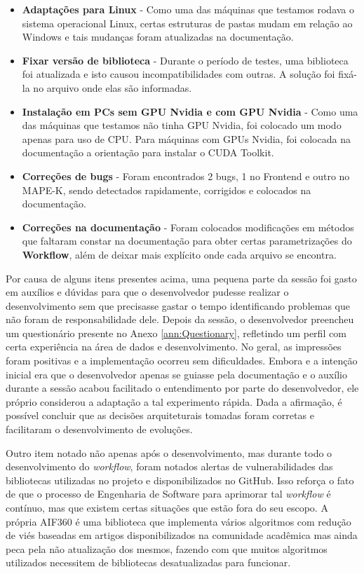 \documentclass[portugues]{ic-tese}
\begin{document}
\begin{itemize}
\item \textbf{Adaptações para Linux} - Como uma das máquinas que testamos rodava o sistema operacional Linux, certas estruturas de pastas mudam em relação ao Windows e tais mudanças foram atualizadas na documentação.
\item \textbf{Fixar versão de biblioteca} - Durante o período de testes, uma biblioteca foi atualizada e isto causou incompatibilidades com outras. A solução foi fixá-la no arquivo onde elas são informadas.
\item \textbf{Instalação em PCs sem GPU Nvidia e com GPU Nvidia} - Como uma das máquinas que testamos não tinha GPU Nvidia, foi colocado um modo apenas para uso de CPU. Para máquinas com GPUs Nvidia, foi colocada na documentação a orientação para instalar o CUDA Toolkit.
\item \textbf{Correções de bugs} - Foram encontrados 2 bugs, 1 no Frontend e outro no MAPE-K, sendo detectados rapidamente, corrigidos e colocados na documentação.
\item \textbf{Correções na documentação} - Foram colocados modificações em métodos que faltaram constar na documentação para obter certas parametrizações do \textbf{Workflow}, além de deixar mais explícito onde cada arquivo se encontra.
\end{itemize}

Por causa de alguns itens presentes acima, uma pequena parte da sessão foi gasto em auxílios e dúvidas para que o desenvolvedor pudesse realizar o desenvolvimento sem que precisasse gastar o tempo identificando problemas que não foram de responsabilidade dele. Depois da sessão, o desenvolvedor preencheu um questionário presente no Anexo \ref{ann:Questionary}, refletindo um perfil com certa experiência na área de dados e desenvolvimento. No geral, as impressões foram positivas e a implementação ocorreu sem dificuldades. Embora  e a intenção inicial era que o desenvolvedor apenas se guiasse pela documentação e o auxílio durante a sessão acabou facilitado o entendimento por parte do desenvolvedor, ele próprio considerou a adaptação a tal experimento rápida. Dada a afirmação, é possível concluir que as decisões arquiteturais tomadas foram corretas e facilitaram o desenvolvimento de evoluções.

Outro item notado não apenas após o desenvolvimento, mas durante todo o desenvolvimento do \textit{workflow}, foram notados alertas de vulnerabilidades das bibliotecas utilizadas no projeto e disponibilizados no GitHub. Isso reforça o fato de que o processo de Engenharia de Software para aprimorar tal \textit{workflow} é contínuo, mas que existem certas situações que estão fora do seu escopo. A própria AIF360 é uma biblioteca que implementa vários algoritmos com redução de viés baseadas em artigos disponibilizados na comunidade acadêmica mas ainda peca pela não atualização dos mesmos, fazendo com que muitos algoritmos utilizados necessitem de bibliotecas desatualizadas para funcionar.
\end{document}

